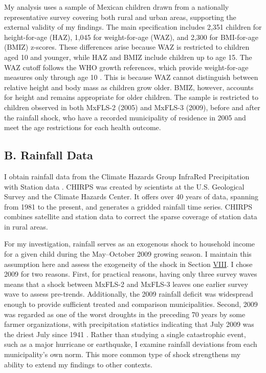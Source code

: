 \documentclass[12pt]{article}
\begin{document}
My analysis uses a sample of Mexican children drawn from a nationally representative survey covering both rural and urban areas, supporting the external validity of my findings. The main specification includes 2,351 children for height-for-age (HAZ), 1,045 for weight-for-age (WAZ), and 2,300 for BMI-for-age (BMIZ) z-scores. These differences arise because WAZ is restricted to children aged 10 and younger, while HAZ and BMIZ include children up to age 15. The WAZ cutoff follows the WHO growth references, which provide weight-for-age measures only through age 10 \parencite{deonisDevelopmentWHOGrowth2007}. This is because WAZ cannot distinguish between relative height and body mass as children grow older. BMIZ, however, accounts for height and remains appropriate for older children. The sample is restricted to children observed in both MxFLS-2 (2005) and MxFLS-3 (2009), before and after the rainfall shock, who have a recorded municipality of residence in 2005 and meet the age restrictions for each health outcome.

\subsection*{B. Rainfall Data}

I obtain rainfall data from the Climate Hazards Group InfraRed Precipitation with Station data \parencite[CHIRPS;][]{funkClimateHazardsInfrared2015}. CHIRPS was created by scientists at the U.S. Geological Survey and the Climate Hazards Center. It offers over 40 years of data, spanning from 1981 to the present, and generates a gridded rainfall time series. CHIRPS combines satellite and station data to correct the sparse coverage of station data in rural areas.

For my investigation, rainfall serves as an exogenous shock to household income for a given child during the May--October 2009 growing season. I maintain this assumption here and assess the exogeneity of the shock in Section \hyperref[sec:VIII]{VIII}. I chose 2009 for two reasons. First, for practical reasons, having only three survey waves means that a shock between MxFLS-2 and MxFLS-3 leaves one earlier survey wave to assess pre-trends. Additionally, the 2009 rainfall deficit was widespread enough to provide sufficient treated and comparison municipalities. Second, 2009 was regarded as one of the worst droughts in the preceding 70 years by some farmer organizations, with precipitation statistics indicating that July 2009 was the driest July since 1941 \parencite{davydova-belitskayaMexico2010}. Rather than studying a single catastrophic event, such as a major hurricane or earthquake, I examine rainfall deviations from each municipality's own norm. This more common type of shock strengthens my ability to extend my findings to other contexts.
\end{document}
